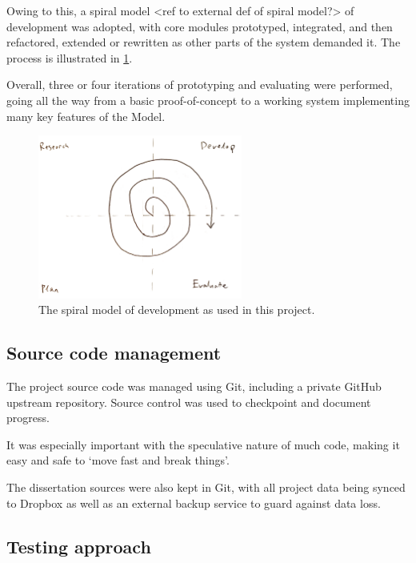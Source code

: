 Owing to this, a spiral model <ref to external def of spiral model?> of development was adopted, with core modules prototyped, integrated, and then refactored, extended or rewritten as other parts of the system demanded it.
The process is illustrated in \cref{fig:prep:spiral-model}.

Overall, three or four iterations of prototyping and evaluating were performed, going all the way from a basic proof-of-concept to a working system implementing many key features of the Model.

\begin{figure}[h]
	\centering
	\includegraphics[width=0.6\textwidth]{images/temp/spiral}
	\caption{The spiral model of development as used in this project.}
	\label{fig:prep:spiral-model}
\end{figure}



\subsection{Source code management}\label{sec:prep:softeng:scm}

The project source code was managed using Git, including a private GitHub upstream repository.
Source control was used to checkpoint and document progress.

It was especially important with the speculative nature of much code, making it easy and safe to `move fast and break things'.

The dissertation sources were also kept in Git, with all project data being synced to Dropbox as well as an external backup service to guard against data loss.

\subsection{Testing approach}\label{sec:prep:softeng:testing}

